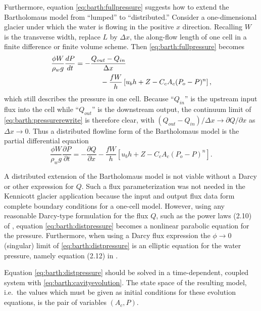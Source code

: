 \documentclass[review,letterpaper]{igs}
\begin{document}
Furthermore, equation \eqref{eq:barth:fullpressure} suggests how to extend the Bartholomaus model from ``lumped'' to ``distributed.''  Consider a one-dimensional glacier under which the water is flowing in the positive $x$ direction.  Recalling $W$ is the transverse width, replace $L$ by $\Delta x$, the along-flow length of one cell in a finite difference or finite volume scheme.  Then \eqref{eq:barth:fullpressure} becomes
\begin{align}
&\frac{\phi W}{\rho_w g}\frac{dP}{dt} = - \frac{Q_{out} - Q_{in}}{\Delta x}  \label{eq:barth:pressurerewrite} \\
&\qquad \qquad \qquad \quad - \frac{f W}{h} \left[u_b h + Z - C_c A_c (P_o-P)^n\right], \notag
\end{align}
which still describes the pressure in one cell.  Because ``$Q_{in}$'' is the upstream input flux into the cell while ``$Q_{out}$'' is the downstream output, the continuum limit of \eqref{eq:barth:pressurerewrite} is therefore clear, with $(Q_{out} - Q_{in})/\Delta x \to \partial Q/\partial x$ as $\Delta x \to 0$.  Thus a distributed flowline form of the Bartholomaus model is the partial differential equation
\begin{equation}
\frac{\phi W}{\rho_w g} \frac{\partial P}{\partial t} = - \frac{\partial Q}{\partial x} - \frac{f W}{h} \left[u_b h + Z - C_c A_c (P_o-P)^n\right]. \label{eq:barth:distpressure}
\end{equation}

A distributed extension of the Bartholomaus model is not viable without a Darcy or other expression for $Q$.  Such a flux parameterization was not needed in the Kennicott glacier application because the input and output flux data form complete boundary conditions for a one-cell model.  However, using any reasonable Darcy-type formulation for the flux $Q$, such as the power laws (2.10) of \cite{Schoofetal2012}, equation \eqref{eq:barth:distpressure} becomes a nonlinear parabolic equation for the pressure.  Furthermore, when using a Darcy flux expression the $\phi\to 0$ (singular) limit of \eqref{eq:barth:distpressure} is an elliptic equation for the water pressure, namely equation (2.12) in \cite{Schoofetal2012}.

Equation \eqref{eq:barth:distpressure} should be solved in a time-dependent, coupled system with \eqref{eq:barth:cavityevolution}.  The state space of the resulting model, i.e.~the values which must be given as initial conditions for these evolution equations, is the pair of variables $(A_c,P)$.
\end{document}
